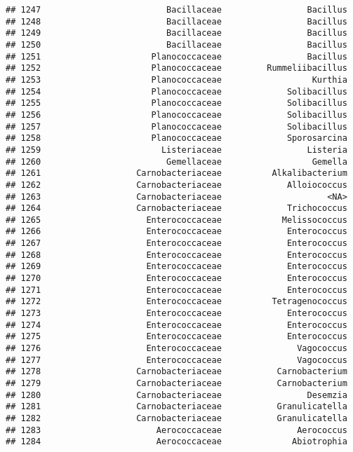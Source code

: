 \documentclass[
]{article}
\begin{document}
\begin{verbatim}
## 1247                         Bacillaceae                 Bacillus
## 1248                         Bacillaceae                 Bacillus
## 1249                         Bacillaceae                 Bacillus
## 1250                         Bacillaceae                 Bacillus
## 1251                      Planococcaceae                 Bacillus
## 1252                      Planococcaceae         Rummeliibacillus
## 1253                      Planococcaceae                  Kurthia
## 1254                      Planococcaceae             Solibacillus
## 1255                      Planococcaceae             Solibacillus
## 1256                      Planococcaceae             Solibacillus
## 1257                      Planococcaceae             Solibacillus
## 1258                      Planococcaceae             Sporosarcina
## 1259                        Listeriaceae                 Listeria
## 1260                         Gemellaceae                  Gemella
## 1261                   Carnobacteriaceae          Alkalibacterium
## 1262                   Carnobacteriaceae             Alloiococcus
## 1263                   Carnobacteriaceae                     <NA>
## 1264                   Carnobacteriaceae             Trichococcus
## 1265                     Enterococcaceae            Melissococcus
## 1266                     Enterococcaceae             Enterococcus
## 1267                     Enterococcaceae             Enterococcus
## 1268                     Enterococcaceae             Enterococcus
## 1269                     Enterococcaceae             Enterococcus
## 1270                     Enterococcaceae             Enterococcus
## 1271                     Enterococcaceae             Enterococcus
## 1272                     Enterococcaceae          Tetragenococcus
## 1273                     Enterococcaceae             Enterococcus
## 1274                     Enterococcaceae             Enterococcus
## 1275                     Enterococcaceae             Enterococcus
## 1276                     Enterococcaceae               Vagococcus
## 1277                     Enterococcaceae               Vagococcus
## 1278                   Carnobacteriaceae           Carnobacterium
## 1279                   Carnobacteriaceae           Carnobacterium
## 1280                   Carnobacteriaceae                 Desemzia
## 1281                   Carnobacteriaceae           Granulicatella
## 1282                   Carnobacteriaceae           Granulicatella
## 1283                       Aerococcaceae               Aerococcus
## 1284                       Aerococcaceae              Abiotrophia

\end{verbatim}
\end{document}
